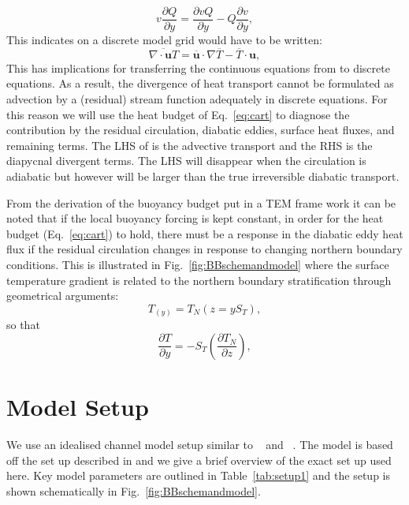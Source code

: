 \begin{equation}
v \frac{\partial Q}{\partial y} =\frac{\partial v Q}{\partial y} - Q \frac{\partial v}{\partial y},
\end{equation}
This indicates on a discrete model grid  would have to be written:
\begin{equation}
\overline{\nabla \cdot \textbf{u}T} = \overline{\textbf{u}} \cdot  \nabla \overline{T} - \overline{T} \cdot \textbf{u} ,
\label{eq:advdiscrete}
\end{equation}
This has implications for transferring the continuous equations from \cite{Marshall2003} to discrete equations. As a result, the divergence of heat transport cannot be formulated as advection by a (residual) stream function adequately in discrete equations. For this reason we will use the heat budget of Eq.~\ref{eq:cart} to diagnose the contribution by the residual circulation, diabatic eddies, surface heat fluxes, and remaining terms. The LHS of  is the advective transport and the RHS is the diapycnal divergent terms. The LHS will disappear when the circulation is adiabatic but however will be larger than the true irreversible diabatic transport.

From the derivation of the buoyancy budget put in a TEM frame work it can be noted that if the local buoyancy forcing is kept constant, in order for the heat budget (Eq.~\ref{eq:cart}) to hold, there must be a response in the diabatic eddy heat flux if the residual circulation changes in response to changing northern boundary conditions. This is illustrated in Fig.~\ref{fig:BBschemandmodel} where the surface temperature gradient is related to the northern boundary stratification through geometrical arguments:
\begin{equation}
T_(y) = T_N(z=yS_T),
\end{equation}
so that
\begin{equation}
\frac{\partial T}{\partial y} =  -S_T \left(\frac{\partial T_N}{\partial z}\right),
\label{EQ:nbc_geom}
\end{equation}

\section{Model Setup}
We use an idealised channel model setup similar to ~\citet{Abernathey2011} and ~\citet{Zhai2014}. The model is based off the set up described in  and we give a brief overview of the exact set up used here. Key model parameters are outlined in Table~\ref{tab:setup1} and the setup is shown schematically in Fig.~\ref{fig:BBschemandmodel}.


